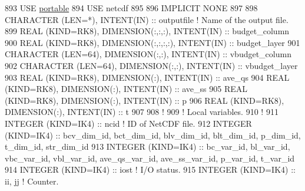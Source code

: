 \begin{DoxyCode}
893     \textcolor{keywordtype}{USE }\hyperlink{namespaceportable}{portable}
894     \textcolor{keywordtype}{USE }netcdf
895 
896     \textcolor{keywordtype}{IMPLICIT NONE}
897 
898     \textcolor{keywordtype}{CHARACTER (LEN=*)}, \textcolor{keywordtype}{INTENT(IN)}                                       :: outputfile       \textcolor{comment}{! Name of the
       output file.}
899     \textcolor{keywordtype}{REAL (KIND=RK8)}, \textcolor{keywordtype}{DIMENSION(:,:,:)}, \textcolor{keywordtype}{INTENT(IN)}                       :: budget\_column
900     \textcolor{keywordtype}{REAL (KIND=RK8)}, \textcolor{keywordtype}{DIMENSION(:,:,:,:)}, \textcolor{keywordtype}{INTENT(IN)}                     :: budget\_layer
901     \textcolor{keywordtype}{CHARACTER (LEN=64)}, \textcolor{keywordtype}{DIMENSION(:,:)}, \textcolor{keywordtype}{INTENT(IN)}                      :: vbudget\_column
902     \textcolor{keywordtype}{CHARACTER (LEN=64)}, \textcolor{keywordtype}{DIMENSION(:,:)}, \textcolor{keywordtype}{INTENT(IN)}                      :: vbudget\_layer
903     \textcolor{keywordtype}{REAL (KIND=RK8)}, \textcolor{keywordtype}{DIMENSION(:)}, \textcolor{keywordtype}{INTENT(IN)}                           :: ave\_qs
904     \textcolor{keywordtype}{REAL (KIND=RK8)}, \textcolor{keywordtype}{DIMENSION(:)}, \textcolor{keywordtype}{INTENT(IN)}                           :: ave\_ss
905     \textcolor{keywordtype}{REAL (KIND=RK8)}, \textcolor{keywordtype}{DIMENSION(:)}, \textcolor{keywordtype}{INTENT(IN)}                           :: p
906     \textcolor{keywordtype}{REAL (KIND=RK8)}, \textcolor{keywordtype}{DIMENSION(:)}, \textcolor{keywordtype}{INTENT(IN)}                           :: t
907 
908     \textcolor{comment}{!}
909     \textcolor{comment}{! Local variables.}
910     \textcolor{comment}{!}
911     \textcolor{keywordtype}{INTEGER (KIND=IK4)}          :: ncid                                                 \textcolor{comment}{! ID of NetCDF
       file.}
912     \textcolor{keywordtype}{INTEGER (KIND=IK4)}          :: bcv\_dim\_id, bct\_dim\_id, blv\_dim\_id, blt\_dim\_id, p\_dim\_id, t\_dim\_id, 
      str\_dim\_id
913     \textcolor{keywordtype}{INTEGER (KIND=IK4)}          :: bc\_var\_id, bl\_var\_id, vbc\_var\_id, vbl\_var\_id, ave\_qs\_var\_id, 
      ave\_ss\_var\_id, p\_var\_id, t\_var\_id
914     \textcolor{keywordtype}{INTEGER (KIND=IK4)}          :: iost                                                 \textcolor{comment}{! I/O status.}
915     \textcolor{keywordtype}{INTEGER (KIND=IK4)}          :: ii, jj                                               \textcolor{comment}{! Counter.}

\end{DoxyCode}
